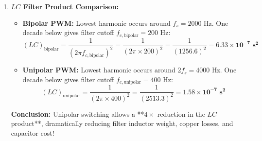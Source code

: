 \documentclass[11pt,a4paper]{article}
\begin{document}
\begin{examplebox}
\begin{enumerate}
  \item \textbf{$LC$ Filter Product Comparison:}
  \begin{itemize}
    \item \textbf{Bipolar PWM:} Lowest harmonic occurs around $f_s = 2000\text{ Hz}$. One decade below gives filter cutoff $f_{c,\text{bipolar}} = 200\text{ Hz}$:
    \begin{equation*}
    (LC)_{\text{bipolar}} = \frac{1}{(2\pi f_{c,\text{bipolar}})^2} = \frac{1}{(2\pi \times 200)^2} = \frac{1}{(1256.6)^2} = \mathbf{6.33 \times 10^{-7}\text{ s}^2}
    \end{equation*}
    \item \textbf{Unipolar PWM:} Lowest harmonic occurs around $2f_s = 4000\text{ Hz}$. One decade below gives filter cutoff $f_{c,\text{unipolar}} = 400\text{ Hz}$:
    \begin{equation*}
    (LC)_{\text{unipolar}} = \frac{1}{(2\pi \times 400)^2} = \frac{1}{(2513.3)^2} = \mathbf{1.58 \times 10^{-7}\text{ s}^2}
    \end{equation*}
  \end{itemize}
  \textbf{Conclusion:} Unipolar switching allows a **$4 \times$ reduction in the $LC$ product**, dramatically reducing filter inductor weight, copper losses, and capacitor cost!
\end{enumerate}
\end{examplebox}
\end{document}
